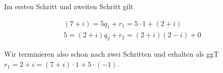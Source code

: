 \begin{solution}
\begin{enumerate}
  Im ersten Schritt und zweiten Schritt gilt

  \begin{align*}
    (7+i) = 5 q_1 + r_1 = 5 \cdot 1 + (2+i) \\
    5 = (2+i)q_2 + r_2 = (2+i)(2-i) + 0
  \end{align*}

  Wir terminieren also schon nach zwei Schritten und erhalten als ggT $r_1 = 2+i = (7+i) \cdot 1 + 5 \cdot (-1)$.


\end{enumerate}

\end{solution}
